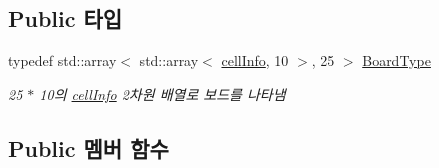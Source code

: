 \subsection*{Public 타입}
\begin{DoxyCompactItemize}
\item 
typedef std\+::array$<$ std\+::array$<$ \mbox{\hyperlink{struct_board_1_1cell_info}{cell\+Info}}, 10 $>$, 25 $>$ \mbox{\hyperlink{class_board_a84bf794bc185e31e333b78bb003c4bc3}{Board\+Type}}
\begin{DoxyCompactList}\small\item\em 25 $\ast$ 10의 \mbox{\hyperlink{struct_board_1_1cell_info}{cell\+Info}} 2차원 배열로 보드를 나타냄 \end{DoxyCompactList}\end{DoxyCompactItemize}
\subsection*{Public 멤버 함수}
